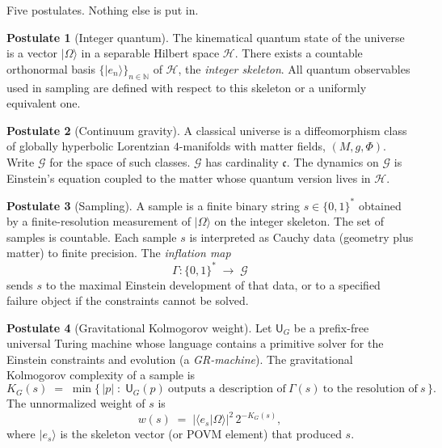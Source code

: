 \documentclass[11pt,a4paper]{article}
\theoremstyle{plain}
\theoremstyle{definition}
\newtheorem{postulate}{Postulate}
\theoremstyle{remark}
\newcommand{\N}{\mathbb{N}}
\newcommand{\cont}{\mathfrak{c}}
\newcommand{\Hil}{\mathcal{H}}
\newcommand{\Geo}{\mathcal{G}}
\newcommand{\KG}{K_{G}}
\newcommand{\UTM}{\mathsf{U}_{G}}
\newcommand{\abs}[1]{\lvert#1\rvert}
\newcommand{\ket}[1]{\lvert#1\rangle}
\newcommand{\braket}[2]{\langle#1|#2\rangle}
\begin{document}
Five postulates.
Nothing else is put in.

\begin{postulate}[Integer quantum]
\label{post:qft}
The kinematical quantum state of the universe is a vector $\ket{\Omega}$ in a separable Hilbert space $\Hil$.
There exists a countable orthonormal basis $\{\ket{e_{n}}\}_{n\in\N}$ of $\Hil$, the \emph{integer skeleton}.
All quantum observables used in sampling are defined with respect to this skeleton or a uniformly equivalent one.
\end{postulate}

\begin{postulate}[Continuum gravity]
\label{post:gr}
A classical universe is a diffeomorphism class of globally hyperbolic Lorentzian $4$-manifolds with matter fields, $(M,g,\Phi)$.
Write $\Geo$ for the space of such classes.
$\Geo$ has cardinality $\cont$.
The dynamics on $\Geo$ is Einstein's equation coupled to the matter whose quantum version lives in $\Hil$.
\end{postulate}

\begin{postulate}[Sampling]
\label{post:sample}
A sample is a finite binary string $s\in\{0,1\}^{*}$ obtained by a finite-resolution measurement of $\ket{\Omega}$ on the integer skeleton.
The set of samples is countable.
Each sample $s$ is interpreted as Cauchy data (geometry plus matter) to finite precision.
The \emph{inflation map}
\begin{equation}
  \Gamma:\{0,1\}^{*} \;\longrightarrow\; \Geo
\end{equation}
sends $s$ to the maximal Einstein development of that data, or to a specified failure object if the constraints cannot be solved.
\end{postulate}

\begin{postulate}[Gravitational Kolmogorov weight]
\label{post:weight}
Let $\UTM$ be a prefix-free universal Turing machine whose language contains a primitive solver for the Einstein constraints and evolution (a \emph{GR-machine}).
The gravitational Kolmogorov complexity of a sample is
\begin{equation}
  \KG(s) \;=\; \min\bigl\{\,\abs{p}\;:\; \UTM(p)\ \text{outputs a description of}\ \Gamma(s)\ \text{to the resolution of}\ s\,\bigr\}.
\end{equation}
The unnormalized weight of $s$ is
\begin{equation}
  w(s) \;=\; \bigl|\braket{e_{s}}{\Omega}\bigr|^{2}\, 2^{-\KG(s)},
  \label{eq:weight}
\end{equation}
where $\ket{e_{s}}$ is the skeleton vector (or POVM element) that produced $s$.
\end{postulate}
\end{document}
